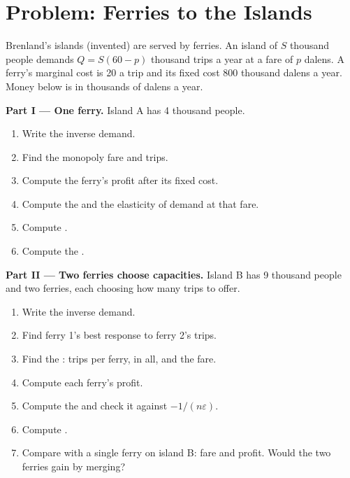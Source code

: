 \section{Problem: Ferries to the Islands}\label{sec:b1:cournot-and-bertrand:problem}

\begin{problem}\label{pb:b1:cournot-and-bertrand:ferries}
Brenland's islands (invented) are served by ferries. An island of $S$
thousand people demands $Q = S(60 - p)$ thousand trips a year at a fare of $p$
dalens. A ferry's marginal cost is 20 a trip and its fixed cost 800 thousand
dalens a year. Money below is in thousands of dalens a year.

\medskip\noindent\textbf{Part I --- One ferry.} Island A has 4 thousand people.
\begin{enumerate}
  \item Write the inverse demand.
  \item Find the monopoly fare and trips.
  \item Compute the ferry's profit after its fixed cost.
  \item Compute the  and the elasticity of demand at that fare.
  \item Compute .
  \item Compute the .
\end{enumerate}

\medskip\noindent\textbf{Part II --- Two ferries choose capacities.} Island B has 9
thousand people and two ferries, each choosing how many trips to offer.
\begin{enumerate}[resume]
  \item Write the inverse demand.
  \item Find ferry 1's best response to ferry 2's trips.
  \item Find the : trips per ferry, in all, and the fare.
  \item Compute each ferry's profit.
  \item Compute the  and check it against $-1/(n\varepsilon)$.
  \item Compute .
  \item Compare with a single ferry on island B: fare and profit. Would the two ferries gain by merging?
\end{enumerate}


\end{problem}
